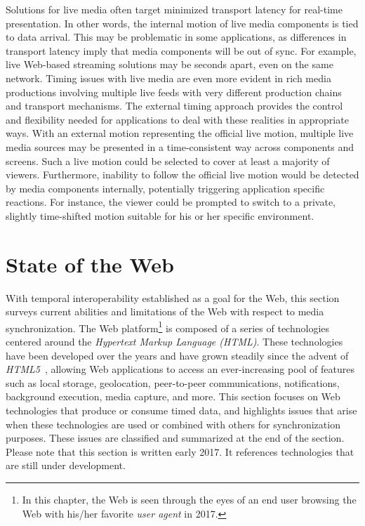 \documentclass[graybox]{svmult}
\begin{document}
Solutions for live media often target minimized transport latency for real-time 
presentation. In other words, the internal motion of live media
components is tied to data arrival. This may be problematic in some
applications, as differences in transport latency imply that media components
will be out of sync. For example, live Web-based streaming solutions may be
seconds apart, even on the same network. Timing issues with live media are even
more evident in rich media productions involving multiple live feeds with very
different production chains and transport mechanisms. The external timing
approach provides the control and flexibility needed for applications to deal
with these realities in appropriate ways. With an external motion representing
the official live motion, multiple live media sources may be presented in a
time-consistent way across components and screens. Such a live motion could be
selected to cover at least a majority of viewers. Furthermore, inability to
follow the official live motion would be detected by media components
internally, potentially triggering application specific reactions. For
instance, the viewer could be prompted to switch to a private, slightly time-shifted 
motion suitable for his or her specific environment.



\section{State of the Web}
\label{sec:web}
With temporal interoperability established as a goal for the Web, this section
surveys current abilities and limitations of the Web with respect to
media synchronization. The Web platform\footnote{In this chapter, the Web is
seen through the eyes of an end user browsing the Web with his/her favorite
\emph{user agent} in 2017.} is composed of a series of technologies centered
around the \emph{Hypertext Markup Language (HTML)}. These technologies have
been developed over the years and have grown steadily since the advent of
\emph{HTML5}~\cite{html5}, allowing Web applications to access an  ever-increasing 
pool of features such as local storage, geo{\-}location, peer-to-peer
communications, notifications, background execution, media capture, and more.
This section focuses on Web technologies that produce or
consume timed data, and highlights issues that arise when these technologies
are used or combined with others for synchronization purposes. These issues
are classified and summarized at the end of the section. Please note that this
section is written early 2017. It references technologies that are still under
development.
\end{document}
